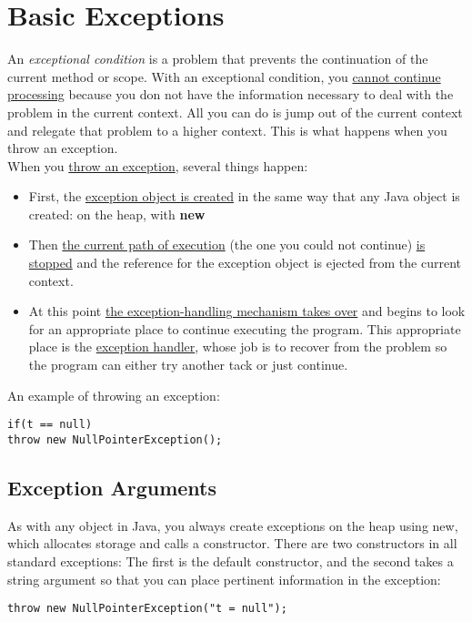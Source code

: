 \documentclass[10pt,letterpaper]{report}
\begin{document}
\section{Basic Exceptions}
An \textit{exceptional condition} is a problem that prevents the continuation of the current method or scope. With an exceptional condition, you \underline{cannot continue} \underline{processing} because you don not have the information necessary to deal with the problem in the current context. All you can do is jump out of the current context and relegate that problem to a higher context. This is what happens when you throw an exception.\\
When you \underline{throw an exception}, several things happen:
\begin{itemize}
\item First, the \underline{exception object is created} in the same way that any Java object is created: on the heap, with \textbf{new}
\item Then \underline{the current path of execution} (the one you could not continue) \underline{is stopped} and the reference for the exception object is ejected from the current context.
\item At this point \underline{the exception-handling mechanism takes over} and begins to look for an appropriate place to continue executing the program. This appropriate place is the \underline{exception handler}, whose job is to recover from the problem so the program can either try another tack or just continue.
\end{itemize}
An example of throwing an exception:

\begin{lstlisting}
if(t == null)
throw new NullPointerException();
\end{lstlisting}

\subsection{Exception Arguments}

As with any object in Java, you always create exceptions on the heap using new, which allocates storage and calls a constructor. There are two constructors in all standard exceptions: The first is the default constructor, and the second takes a string argument so that you can place pertinent information in the exception:

\begin{lstlisting}
throw new NullPointerException("t = null");
\end{lstlisting}
\end{document}
